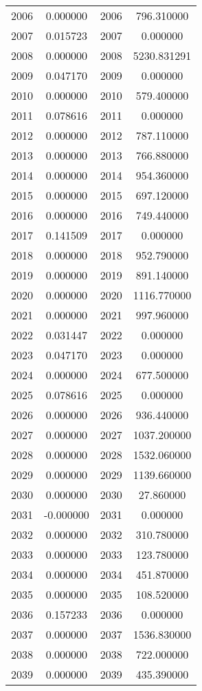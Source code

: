 \documentclass[12pt]{article}
\begin{document}
\begin{longtable}{@{}cccc@{}}
2006 & 0.000000 & 2006 & 796.310000 \\
2007 & 0.015723 & 2007 & 0.000000 \\
2008 & 0.000000 & 2008 & 5230.831291 \\
2009 & 0.047170 & 2009 & 0.000000 \\
2010 & 0.000000 & 2010 & 579.400000 \\
2011 & 0.078616 & 2011 & 0.000000 \\
2012 & 0.000000 & 2012 & 787.110000 \\
2013 & 0.000000 & 2013 & 766.880000 \\
2014 & 0.000000 & 2014 & 954.360000 \\
2015 & 0.000000 & 2015 & 697.120000 \\
2016 & 0.000000 & 2016 & 749.440000 \\
2017 & 0.141509 & 2017 & 0.000000 \\
2018 & 0.000000 & 2018 & 952.790000 \\
2019 & 0.000000 & 2019 & 891.140000 \\
2020 & 0.000000 & 2020 & 1116.770000 \\
2021 & 0.000000 & 2021 & 997.960000 \\
2022 & 0.031447 & 2022 & 0.000000 \\
2023 & 0.047170 & 2023 & 0.000000 \\
2024 & 0.000000 & 2024 & 677.500000 \\
2025 & 0.078616 & 2025 & 0.000000 \\
2026 & 0.000000 & 2026 & 936.440000 \\
2027 & 0.000000 & 2027 & 1037.200000 \\
2028 & 0.000000 & 2028 & 1532.060000 \\
2029 & 0.000000 & 2029 & 1139.660000 \\
2030 & 0.000000 & 2030 & 27.860000 \\
2031 & -0.000000 & 2031 & 0.000000 \\
2032 & 0.000000 & 2032 & 310.780000 \\
2033 & 0.000000 & 2033 & 123.780000 \\
2034 & 0.000000 & 2034 & 451.870000 \\
2035 & 0.000000 & 2035 & 108.520000 \\
2036 & 0.157233 & 2036 & 0.000000 \\
2037 & 0.000000 & 2037 & 1536.830000 \\
2038 & 0.000000 & 2038 & 722.000000 \\
2039 & 0.000000 & 2039 & 435.390000 \\

\end{longtable}
\end{document}
